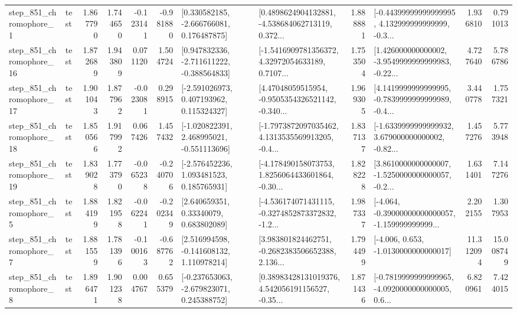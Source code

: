 \begin{tabular}{llrrrrllrlrr}
   step\_851\_chromophore\_1 &      test &      1.867790 &    1.744650 &     -0.123141 & -0.981880 &    [0.330582185, -2.666766081, 0.176487875] &  [0.4898624904132881, -4.538684062713119, 0.372... &       1.888881 &  [-0.44399999999999995, 4.132999999999999, -0.3... &            1.936810 &          0.791013 \\
  step\_851\_chromophore\_16 &      test &      1.872689 &    1.943809 &      0.071120 &  1.504724 &   [0.947832336, -2.711611222, -0.388564833] &  [-1.5416909781356372, 4.32972054633189, 0.7107... &       1.753504 &  [1.426000000000002, -3.9549999999999983, -0.22... &            4.727640 &          5.786786 \\
  step\_851\_chromophore\_17 &      test &      1.901043 &    1.877962 &     -0.023081 &  0.298915 &    [-2.591026973, 0.407193962, 0.115324327] &  [4.47048059515954, -0.9505354326521142, -0.340... &       1.969305 &  [4.1419999999999995, -0.7839999999999989, -0.4... &            3.440778 &          1.757321 \\
  step\_851\_chromophore\_18 &      test &      1.850566 &    1.917992 &      0.067426 &  1.457432 &   [-1.020822391, 2.468995021, -0.551113696] &  [-1.7973872097035462, 4.1313535569913205, -0.4... &       1.837137 &  [-1.6339999999999932, 3.679000000000002, -0.82... &            1.457276 &          5.773948 \\
  step\_851\_chromophore\_19 &      test &      1.839028 &    1.773790 &     -0.065238 & -0.240706 &    [-2.576452236, 1.093481523, 0.185765931] &  [-4.178490158073753, 1.8256064433601864, -0.30... &       1.828228 &  [3.8610000000000007, -1.5250000000000057, -0.2... &            1.631401 &          7.147276 \\
   step\_851\_chromophore\_5 &      test &      1.884199 &    1.821958 &     -0.062241 & -0.202349 &      [2.640659351, 0.33340079, 0.683802089] &  [-4.536174071431115, -0.3274852873372832, -1.2... &       1.987337 &  [-4.064, -0.39000000000000057, -1.159999999999... &            2.202155 &          1.307953 \\
   step\_851\_chromophore\_7 &      test &      1.881559 &    1.781396 &     -0.100163 & -0.687762 &    [2.516994598, -0.141608132, 1.110978214] &  [3.983801824462751, -0.2682383506652388, 2.136... &       1.794499 &               [-4.006, 0.653, -1.0130000000000017] &           11.312094 &         15.008749 \\
   step\_851\_chromophore\_8 &      test &      1.896471 &    1.901238 &      0.004767 &  0.655379 &   [-0.237653063, -2.679823071, 0.245388752] &  [0.38983428131019376, 4.542056191156527, -0.35... &       1.871436 &  [-0.7819999999999965, -4.0920000000000005, 0.6... &            6.820961 &          7.424015 \\

\end{tabular}
